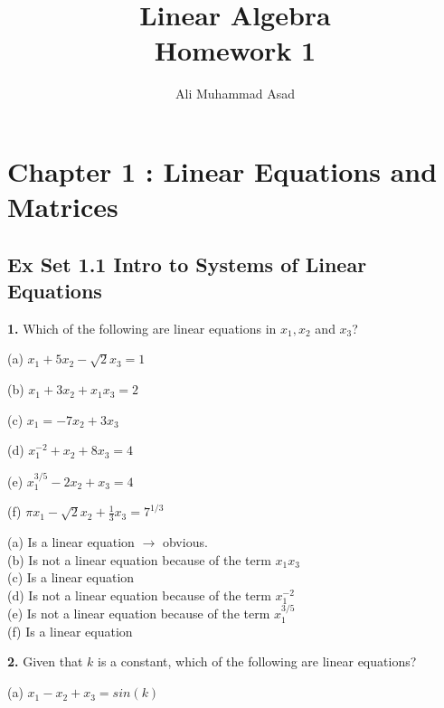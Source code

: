 \documentclass[addpoints]{exam}
\title{Linear Algebra\\ Homework 1}
\author{Ali Muhammad Asad}
\begin{document}
\maketitle
\section*{\textbf{Chapter 1 : Linear Equations and Matrices}}
\subsection*{\textbf{Ex Set 1.1 Intro to Systems of Linear Equations}}
\begin{questions}
    \question
    \textbf{1.} Which of the following are linear equations in $ x_1, x_2 $ and $ x_3 $? 

    \hspace{3mm} (a) $ x_1 + 5x_2 - \sqrt{2}x_3 = 1 $
    
    \hspace{3mm} (b) $ x_1 + 3x_2 + x_1x_3 = 2 $
    
    \hspace{3mm} (c) $ x_1 = -7x_2 + 3x_3 $

    \hspace{3mm} (d) $ x_{1}^{-2} + x_2 + 8x_3 = 4 $
    
    \hspace{3mm} (e) $ x_{1}^{3/5} - 2x_2 + x_3 = 4 $

    \hspace{3mm} (f) $ \pi x_1 - \sqrt{2}x_2 + \frac{1}{3}x_3 = 7^{1/3} $
    \begin{solution}
        
        (a) Is a linear equation $ \rightarrow $ obvious. \\ 
        (b) Is not a linear equation because of the term $ x_1x_3 $ \\ 
        (c) Is a linear equation \\ 
        (d) Is not a linear equation because of the term $ x_{1}^{-2} $ \\ 
        (e) Is not a linear equation because of the term $ x_{1}^{3/5} $ \\ 
        (f) Is a linear equation
    \end{solution}
    \question
    \textbf{2. } Given that $k$ is a constant, which of the following are linear equations? 

    \hspace{3mm} (a) $ x_1 - x_2 + x_3 = sin(k) $


\end{questions}
\end{document}
